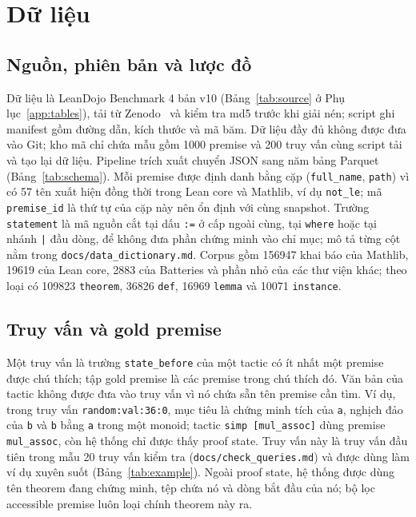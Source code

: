 \documentclass[11pt,a4paper,oneside]{report}
\newcommand{\code}[1]{\texttt{#1}}
\begin{document}
\chapter{Dữ liệu}\label{sec:data}

\section{Nguồn, phiên bản và lược đồ}

Dữ liệu là LeanDojo Benchmark 4 bản v10 (Bảng~\ref{tab:source} ở Phụ lục~\ref{app:tables}), tải từ
Zenodo~\cite{zenodo2024} và kiểm tra md5 trước khi giải nén; script ghi manifest gồm đường dẫn, kích thước và mã băm. Dữ
liệu đầy đủ không được đưa vào Git; kho mã chỉ chứa mẫu gồm \num{1000} premise và 200 truy vấn cùng script tải và tạo lại
dữ liệu. Pipeline trích xuất chuyển JSON sang năm bảng Parquet (Bảng~\ref{tab:schema}). Mỗi premise được định danh bằng cặp
(\code{full\_name}, \code{path}) vì có 57 tên xuất hiện đồng thời trong Lean core và Mathlib, ví dụ \code{not\_le}; mã
\code{premise\_id} là thứ tự của cặp này nên ổn định với cùng snapshot. Trường \code{statement} là mã nguồn cắt tại dấu
\code{:=} ở cấp ngoài cùng, tại \code{where} hoặc tại nhánh \code{|} đầu dòng, để không đưa phần chứng minh vào chỉ mục;
mô tả từng cột nằm trong \code{docs/data\_dictionary.md}. Corpus gồm \num{156947} khai báo của Mathlib, \num{19619} của Lean
core, \num{2883} của Batteries và phần nhỏ của các thư viện khác; theo loại có \num{109823} \code{theorem}, \num{36826}
\code{def}, \num{16969} \code{lemma} và \num{10071} \code{instance}.

\section{Truy vấn và gold premise}

Một truy vấn là trường \code{state\_before} của một tactic có ít nhất một premise được chú thích; tập gold premise là
các premise trong chú thích đó. Văn bản của tactic không được đưa vào truy vấn vì nó chứa sẵn tên premise cần tìm. Ví dụ,
trong truy vấn \code{random:val:36:0}, mục tiêu là chứng minh tích của \code{a}, nghịch đảo của \code{b} và \code{b} bằng
\code{a} trong một monoid; tactic \code{simp [mul\_assoc]} dùng premise \code{mul\_assoc}, còn hệ thống chỉ được thấy proof
state. Truy vấn này là truy vấn đầu tiên trong mẫu 20 truy vấn kiểm tra (\code{docs/check\_queries.md}) và được dùng làm ví dụ xuyên suốt
(Bảng~\ref{tab:example}). Ngoài proof state, hệ thống được dùng tên theorem đang chứng minh, tệp chứa nó và dòng bắt đầu
của nó; bộ lọc accessible premise luôn loại chính theorem này ra.
\end{document}
